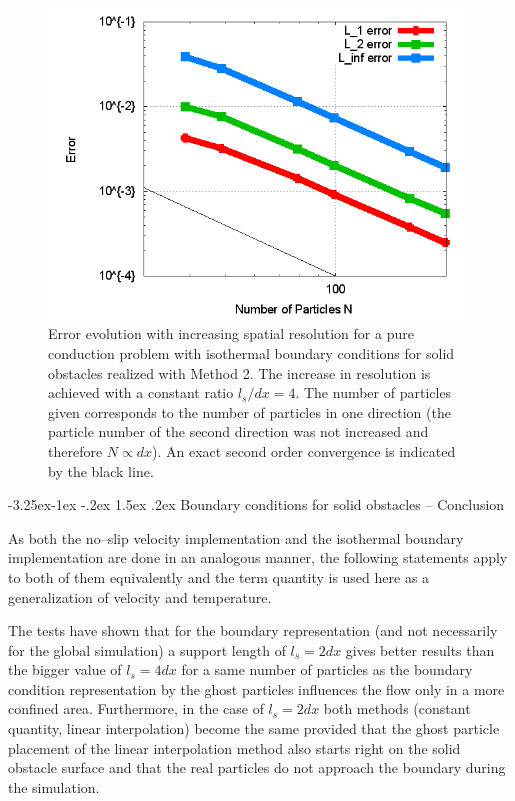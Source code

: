 \documentclass[11pt,a4paper,twoside]{report}
\makeatletter
\renewcommand\paragraph{\@startsection{paragraph}{4}{\z@}%
  {-3.25ex\@plus -1ex \@minus -.2ex}%
  {1.5ex \@plus .2ex}%
  {\normalfont\normalsize\bfseries}}
\makeatother
\begin{document}
\begin{figure}[!htbp]
\centering
\label{fig:SolObs_Thermal_BC2_ResolutionError}

\includegraphics[width=11cm]{Graphics/results/Porosities/LinearWall/ThermalBC2_Resolution/ErrorResolution}

\caption[Error resolution ]{Error evolution with increasing spatial resolution for a pure conduction problem with isothermal boundary conditions for solid obstacles realized with Method 2. The increase in resolution is achieved with a constant ratio $l_s/dx=4$.
The number of particles given corresponds to the number of particles in one direction (the particle number of the second direction was not increased and therefore $N \propto dx$). An exact second order convergence is indicated by the black line.}

\end{figure}

\paragraph{Boundary conditions for solid obstacles -- Conclusion}
\label{sec:TestSolobs_BC_Conclusion}


As both the no--slip velocity implementation and the isothermal boundary implementation are done in an analogous manner, the following statements apply to both of them equivalently and the term quantity is used here as a generalization of velocity and temperature. 

The tests have shown that for the boundary representation (and not necessarily for the global simulation) a support length of $l_s=2dx$ gives better results than the bigger value of $l_s=4dx$ for a same number of particles as the boundary condition representation by the ghost particles influences the flow only in a more confined area. Furthermore, in the case of $l_s=2dx$ both methods (constant quantity, linear interpolation) become the same provided that the ghost particle placement of the linear interpolation method also starts right on the solid obstacle surface and that the real particles do not approach the boundary during the simulation.
\end{document}

